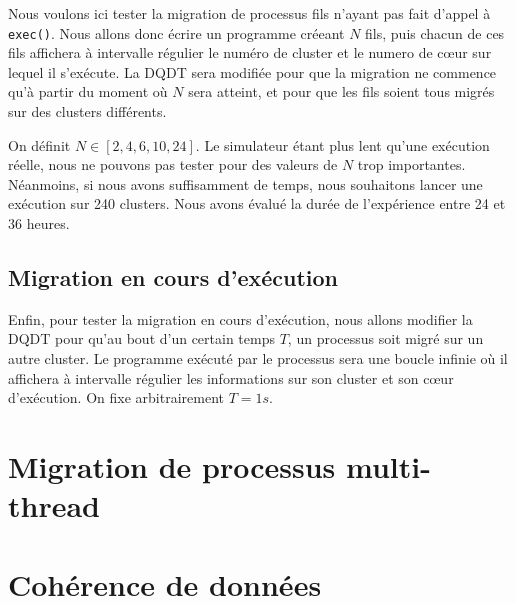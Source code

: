       Nous voulons ici tester la migration de processus fils n'ayant pas fait
      d'appel à \texttt{exec()}. Nous allons donc écrire un programme créeant
      $N$ fils, puis chacun de ces fils affichera à intervalle régulier le
      numéro de cluster et le numero de c\oe ur sur lequel il s'exécute. La DQDT
      sera modifiée pour que la migration ne commence qu'à partir du moment où
      $N$ sera atteint, et pour que les fils soient tous migrés sur des clusters
      différents.

      On définit $N \in [2, 4, 6, 10, 24]$. Le simulateur étant plus lent qu'une
      exécution réelle, nous ne pouvons pas tester pour des valeurs de $N$ trop
      importantes. Néanmoins, si nous avons suffisamment de temps, nous
      souhaitons lancer une exécution sur 240 clusters. Nous avons évalué la
      durée de l'expérience entre 24 et 36 heures.

    \subsection{Migration en cours d'exécution}

      Enfin, pour tester la migration en cours d'exécution, nous allons modifier
      la DQDT pour qu'au bout d'un certain temps $T$, un processus soit migré
      sur un autre cluster. Le programme exécuté par le processus sera une
      boucle infinie où il affichera à intervalle régulier les informations sur
      son cluster et son c\oe ur d'exécution. On fixe arbitrairement $T = 1s$.

  \section{Migration de processus multi-thread}

      \todo{}

  \section{Cohérence de données}

